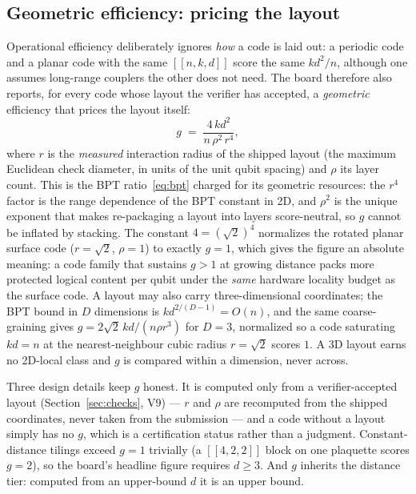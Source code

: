 \documentclass[11pt]{article}
\newcommand{\eff}{kd^2/n}
\begin{document}
	\subsection{Geometric efficiency: pricing the layout}
	\label{sec:geff}

	Operational efficiency deliberately ignores \emph{how} a code is laid
	out: a periodic code and a planar code with the same $[[n,k,d]]$ score
	the same $\eff$, although one assumes long-range couplers the other does
	not need. The board therefore also reports, for every code whose layout
	the verifier has accepted, a \emph{geometric} efficiency that prices the
	layout itself:
	\begin{equation}
		g \;=\; \frac{4\,kd^2}{n\,\rho^2\,r^4},
		\label{eq:geff}
	\end{equation}
	where $r$ is the \emph{measured} interaction radius of the shipped
	layout (the maximum Euclidean check diameter, in units of the unit qubit
	spacing) and $\rho$ its layer count. This is the BPT
	ratio~\eqref{eq:bpt} charged for its geometric resources: the $r^4$
	factor is the range dependence of the BPT constant in 2D, and $\rho^2$
	is the unique exponent that makes re-packaging a layout into layers
	score-neutral, so $g$ cannot be inflated by stacking. The constant
	$4=(\sqrt2)^4$ normalizes the rotated planar surface code ($r=\sqrt2$,
	$\rho=1$) to exactly $g=1$, which gives the figure an absolute meaning:
	a code family that sustains $g>1$ at growing distance packs more
	protected logical content per qubit under the \emph{same} hardware
	locality budget as the surface code. A layout may also carry
	three-dimensional coordinates; the BPT bound in $D$ dimensions is
	$kd^{2/(D-1)}=O(n)$, and the same coarse-graining gives
	$g=2\sqrt2\,kd/(n\rho r^3)$ for $D=3$, normalized so a code saturating
	$kd=n$ at the nearest-neighbour cubic radius $r=\sqrt2$ scores $1$. A 3D
	layout earns no 2D-local class and $g$ is compared within a dimension,
	never across.

	Three design details keep $g$ honest. It is computed only from a
	verifier-accepted layout (Section~\ref{sec:checks}, V9) --- $r$ and
	$\rho$ are recomputed from the shipped coordinates, never taken from the
	submission --- and a code without a layout simply has no $g$, which is a
	certification status rather than a judgment. Constant-distance tilings
	exceed $g=1$ trivially (a $[[4,2,2]]$ block on one plaquette scores
	$g=2$), so the board's headline figure requires $d\ge 3$. And $g$
	inherits the distance tier: computed from an upper-bound $d$ it is an
	upper bound.
\end{document}
